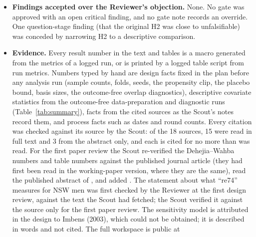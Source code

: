 \begin{itemize}
        answered afterwards: the question wording by the PI, checked by the Reviewer at the
        first design round; the design wording before the design gate; and the claim texts
        and run notes after the results gate. The code review's four minor findings were fixed
        and the analysis then ran without a second code-review round, at the PI's instruction;
        the Reviewer checked the fixes at the first results round
        (Section~\ref{sec:deviations}, disclosure~1). A post-results arithmetic run was not
        code-reviewed (disclosure~2).
  \item \textbf{Findings accepted over the Reviewer's objection.} None. No gate was approved
        with an open critical finding, and no gate note records an override. One question-stage
        finding (that the original H2 was close to unfalsifiable) was conceded by narrowing H2
        to a descriptive comparison.
  \item \textbf{Evidence.} Every result number in the text and tables is a macro generated
        from the metrics of a logged run, or is printed by a logged table script from run
        metrics. Numbers typed by hand are design facts fixed in the plan before any analysis
        run (sample counts, folds, seeds, the propensity clip, the placebo bound, basis sizes,
        the outcome-free overlap diagnostics), descriptive covariate statistics from the
        outcome-free data-preparation and diagnostic runs (Table~\ref{tab:summary}), facts from
        the cited sources as the Scout's notes record them, and process facts such as dates and
        round counts. Every citation was checked against its source by the Scout: of the 18
        sources, 15 were read in full text and 3 from the abstract only, and each is cited for
        no more than was read. For the first paper review the Scout re-verified the Dehejia--Wahba
        numbers and table numbers against the published journal article (they had first been
        read in the working-paper version, where they are the same), read the published
        abstract of \citet{crump2009}, and added \citet{chernozhukov2018}. The statement about
        what ``re74'' measures for NSW men \citep[Sec.~5]{smith2005} was first checked by the
        Reviewer at the first design review, against the text the Scout had fetched; the Scout
        verified it against the source only for the first paper review. The sensitivity model
        is attributed in the design to Imbens (2003), which could not be obtained; it is
        described in words and not cited. The full workspace is public at

\end{itemize}
